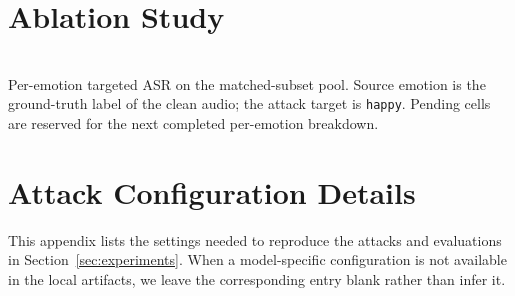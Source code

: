 \section{Ablation Study}
\label{app:ablation}

\begin{center}
\label{tab:app_per_emotion_asr}
{\footnotesize \MakeUppercase{\tablename}~\thetable}\\
{\scriptsize Per-emotion targeted ASR on the matched-subset pool.  Source
emotion is the ground-truth label of the clean audio; the attack target is
\texttt{happy}.  Pending cells are reserved for the next completed
per-emotion breakdown.}\par
\vspace{2pt}
\centering
\scriptsize
\setlength{\tabcolsep}{3pt}
\end{center}

\section{Attack Configuration Details}
\label{app:attack_config}

This appendix lists the settings needed to reproduce the attacks and
evaluations in Section~\ref{sec:experiments}.  When a model-specific
configuration is not available in the local artifacts, we leave the
corresponding entry blank rather than infer it.

